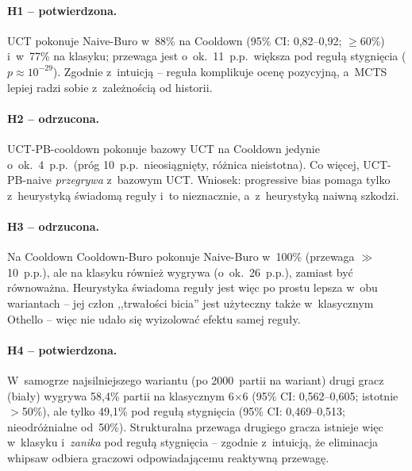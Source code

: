 \documentclass[12pt,a4paper]{article}
\begin{document}
\paragraph{H1 -- potwierdzona.} UCT pokonuje Naive-Buro w~88\% na Cooldown (95\% CI: 0,82--0,92;
$\geq$60\%) i~w~77\% na klasyku; przewaga jest o~ok.\ 11~p.p.\ większa pod regułą stygnięcia
($p\!\approx\!10^{-29}$). Zgodnie z~intuicją -- reguła komplikuje ocenę pozycyjną, a~MCTS lepiej
radzi sobie z~zależnością od historii.

\paragraph{H2 -- odrzucona.} UCT-PB-cooldown pokonuje bazowy UCT na Cooldown jedynie o~ok.\ 4~p.p.\
(próg 10~p.p.\ nieosiągnięty, różnica nieistotna). Co więcej, UCT-PB-naive \emph{przegrywa}
z~bazowym UCT. Wniosek: progressive bias pomaga tylko z~heurystyką świadomą reguły i~to nieznacznie,
a~z~heurystyką naiwną szkodzi.

\paragraph{H3 -- odrzucona.} Na Cooldown Cooldown-Buro pokonuje Naive-Buro w~100\% (przewaga
$\gg$10~p.p.), ale na klasyku również wygrywa (o~ok.\ 26~p.p.), zamiast być równoważna. Heurystyka
świadoma reguły jest więc po prostu lepsza w~obu wariantach -- jej człon ,,trwałości bicia'' jest
użyteczny także w~klasycznym Othello -- więc nie udało się wyizolować efektu samej reguły.

\paragraph{H4 -- potwierdzona.} W~samogrze najsilniejszego wariantu (po 2000~partii na wariant)
drugi gracz (biały) wygrywa 58,4\% partii na klasycznym 6$\times$6 (95\% CI: 0,562--0,605; istotnie
$>$50\%), ale tylko 49,1\% pod regułą stygnięcia (95\% CI: 0,469--0,513; nieodróżnialne od~50\%).
Strukturalna przewaga drugiego gracza istnieje więc w~klasyku i~\emph{zanika} pod regułą stygnięcia
-- zgodnie z~intuicją, że eliminacja whipsaw odbiera graczowi odpowiadającemu reaktywną przewagę.

\end{document}
